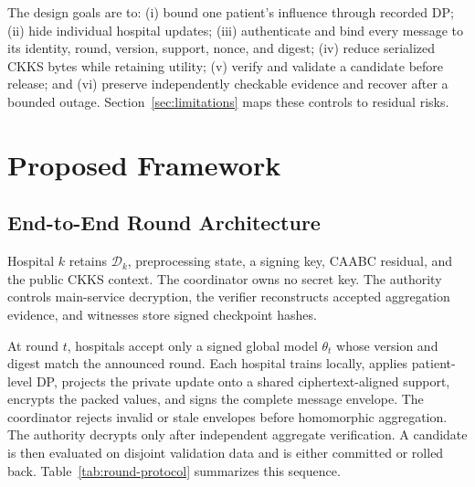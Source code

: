 \documentclass[conference]{IEEEtran}
\begin{document}
The design goals are to: (i) bound one patient's influence through recorded DP;
(ii) hide individual hospital updates; (iii) authenticate and bind every message
to its identity, round, version, support, nonce, and digest; (iv) reduce
serialized CKKS bytes while retaining utility; (v) verify and validate a
candidate before release; and (vi) preserve independently checkable evidence and
recover after a bounded outage. Section~\ref{sec:limitations} maps these controls
to residual risks.

\section{Proposed Framework}
\label{sec:framework}

\subsection{End-to-End Round Architecture}

Hospital $k$ retains $\mathcal{D}_k$, preprocessing state, a signing key, CAABC
residual, and the public CKKS context. The coordinator owns no secret key. The
authority controls main-service decryption, the verifier reconstructs accepted
aggregation evidence, and witnesses store signed checkpoint hashes.

At round $t$, hospitals accept only a signed global model $\theta_t$ whose
version and digest match the announced round. Each hospital trains locally,
applies patient-level DP, projects the private update onto a shared
ciphertext-aligned support, encrypts the packed values, and signs the complete
message envelope. The coordinator rejects invalid or stale envelopes before
homomorphic aggregation. The authority decrypts only after independent
aggregate verification. A candidate is then evaluated on disjoint validation
data and is either committed or rolled back. Table~\ref{tab:round-protocol}
summarizes this sequence.
\end{document}
